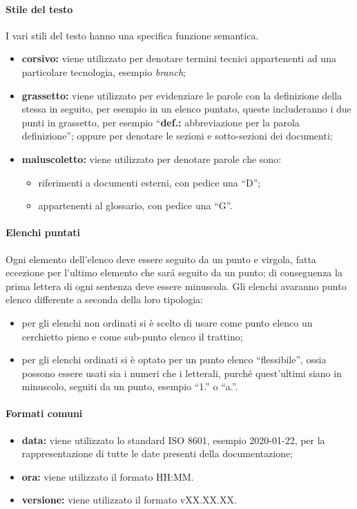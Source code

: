 			\paragraph{Stile del testo}
				I vari stili del testo hanno una specifica funzione semantica.
				\begin{itemize}
					\item \textbf{corsivo:} viene utilizzato per denotare termini tecnici appartenenti ad una particolare tecnologia, esempio \textit{branch};
					\item \textbf{grassetto:} viene utilizzato per evidenziare le parole con la definizione della stessa in seguito, per esempio in un elenco puntato, queste includeranno i due punti in grassetto, per esempio ``\textbf{def.:} abbreviazione per la parola definizione''; oppure per denotare le sezioni e sotto-sezioni dei documenti;
					\item \textbf{maiuscoletto:} viene utilizzato per denotare parole che sono:
						\begin{itemize}
							\item riferimenti a documenti esterni, con pedice una ``D'';
							\item appartenenti al glossario, con pedice una ``G''.
						\end{itemize}
				\end{itemize}
			\paragraph{Elenchi puntati}
				Ogni elemento dell'elenco deve essere seguito da un punto e virgola, fatta eccezione per l'ultimo elemento che sará seguito da un punto; di conseguenza la prima lettera di ogni sentenza deve essere minuscola. Gli elenchi avaranno punto elenco differente a seconda della loro tipologia:
				\begin{itemize}
					\item per gli elenchi non ordinati si è scelto di usare come punto elenco un cerchietto pieno e come sub-punto elenco il trattino;
					\item per gli elenchi ordinati si è optato per un punto elenco ``flessibile'', ossia possono essere usati sia i numeri che i letterali, purché quest'ultimi siano in minuscolo, seguiti da un punto, esempio ``1.'' o ``a.''.
				\end{itemize}
			\paragraph{Formati comuni}
				\begin{itemize}
					\item \textbf{data:} viene utilizzato lo standard ISO 8601, esempio 2020-01-22, per la rappresentazione di tutte le date presenti della documentazione;
					\item \textbf{ora:} viene utilizzato il formato HH:MM.
					\item \textbf{versione:} viene utilizzato il formato vXX.XX.XX.
				\end{itemize}
